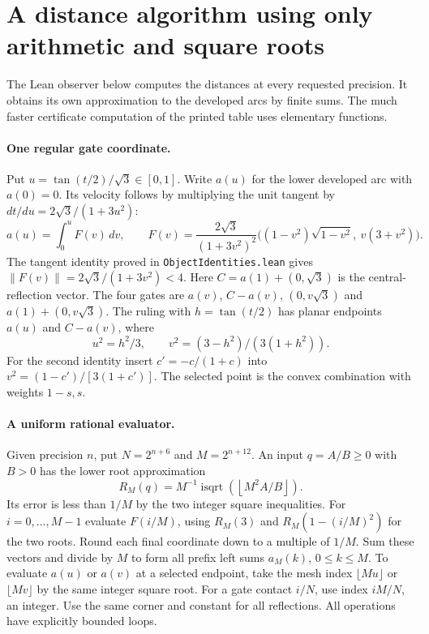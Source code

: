 \section{A distance algorithm using only arithmetic and square roots}
\label{sec:formal}
The Lean observer below computes the distances at every requested precision. It obtains its own approximation to the developed arcs by finite sums. The much faster certificate computation of the printed table uses elementary functions.

\paragraph{One regular gate coordinate.}
Put $u=\tan(t/2)/\sqrt3\in[0,1]$. Write $a(u)$ for the lower developed
arc with $a(0)=0$. Its velocity follows by multiplying the unit tangent
by $dt/du=2\sqrt3/(1+3u^2)$:
\[
 a(u)=\int_0^u F(v)\,dv,\qquad
 F(v)=\frac{2\sqrt3}{(1+3v^2)^2}
       \big((1-v^2)\sqrt{1-v^2},\ v(3+v^2)\big).
\]
The tangent identity proved in \texttt{ObjectIdentities.lean} gives
$\|F(v)\|=2\sqrt3/(1+3v^2)<4$.
Here $C=a(1)+(0,\sqrt3)$ is the central-reflection vector. The four
gates are $a(v)$, $C-a(v)$, $(0,v\sqrt3)$ and $a(1)+(0,v\sqrt3)$.
The ruling with $h=\tan(t/2)$ has planar endpoints $a(u)$ and $C-a(v)$,
where
\[
 u^2=h^2/3,\qquad v^2=(3-h^2)/(3(1+h^2)).
\]
For the second identity insert $c'=-c/(1+c)$ into
$v^2=(1-c')/[3(1+c')]$. The selected point is the convex
combination with weights $1-s,s$.

\paragraph{A uniform rational evaluator.}
Given precision $n$, put $N=2^{n+6}$ and $M=2^{n+12}$.
An input $q=A/B\ge0$ with $B>0$ has the lower root approximation
\[
 R_M(q)=M^{-1}\operatorname{isqrt}\!\left(\left\lfloor
                M^2 A/B\right\rfloor\right).
\]
Its error is less than $1/M$ by the two integer square inequalities.
For $i=0,\ldots,M-1$ evaluate $F(i/M)$, using $R_M(3)$ and
$R_M(1-(i/M)^2)$ for the two roots. Round each final coordinate down
to a multiple of $1/M$. Sum these vectors and divide by $M$ to form
all prefix left sums $a_M(k)$, $0\le k\le M$.
To evaluate $a(u)$ or $a(v)$ at a selected endpoint, take the mesh
index $\lfloor M u\rfloor$ or $\lfloor M v\rfloor$ by the same integer
square root. For a gate contact $i/N$, use index $iM/N$, an integer.
Use the same corner and constant for all reflections. All operations have
explicitly bounded loops.

